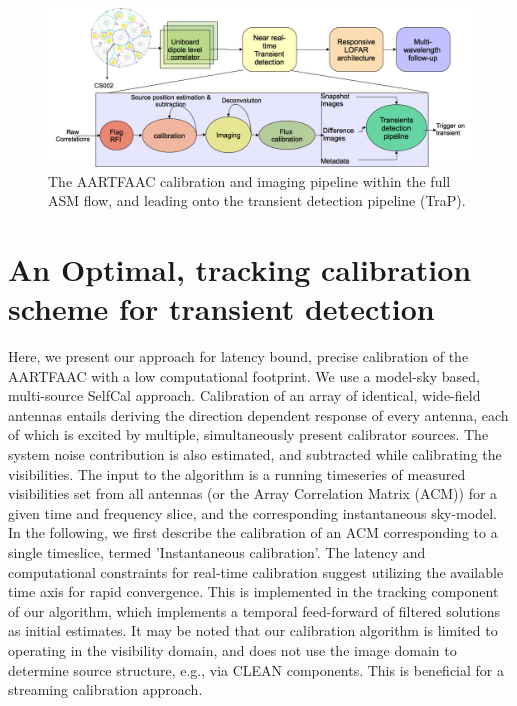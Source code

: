 \documentclass{aa}
\begin{document}
\begin{figure}[tbh]
\centering
\includegraphics[width=1\textwidth]{Figs/AFAAC_blkdia_latest.png}

\caption{\label{fig:The-AARTFAAC-calibration}The AARTFAAC calibration and
imaging pipeline within the full ASM flow, and leading onto the transient
detection pipeline (TraP).}
\end{figure}



\section{\label{sec:An-Optimal,-tracking}An Optimal, tracking calibration
scheme for transient detection}

Here, we present our approach for latency bound, precise calibration
of the AARTFAAC with a low computational footprint. We use a model-sky
based, multi-source SelfCal approach\cite{wijnholds2009multisource}.
Calibration of an array of identical, wide-field antennas entails
deriving the direction dependent response of every antenna, each of
which is excited by multiple, simultaneously present calibrator sources.
The system noise contribution is also estimated, and subtracted while
calibrating the visibilities. The input to the algorithm is a running
timeseries of measured visibilities set from all antennas (or the
Array Correlation Matrix (ACM)) for a given time and frequency slice,
and the corresponding instantaneous sky-model. In the following, we
first describe the calibration of an ACM corresponding to a single
timeslice, termed 'Instantaneous calibration'. The latency and computational
constraints for real-time calibration suggest utilizing the available
time axis for rapid convergence. This is implemented in the tracking
component of our algorithm, which implements a temporal feed-forward
of filtered solutions as initial estimates. It may be noted that our
calibration algorithm is limited to operating in the visibility domain,
and does not use the image domain to determine source structure, e.g.,
via CLEAN components. This is beneficial for a streaming calibration
approach.
\end{document}
